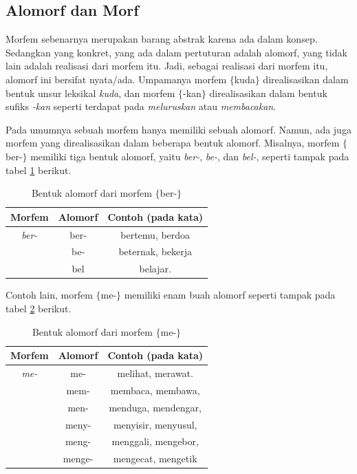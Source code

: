 \subsection{Alomorf dan Morf}
\label{sec:alomorfDanMorf}

Morfem sebenarnya merupakan barang abstrak karena ada dalam konsep. Sedangkan yang konkret, yang ada dalam pertuturan adalah alomorf, yang tidak lain adalah realisasi dari morfem itu\cite{chaer:08:morfologi}. Jadi, sebagai realisasi dari morfem itu, alomorf ini bersifat nyata/ada. Umpamanya morfem $\lbrace$kuda$\rbrace$ direalisasikan dalam bentuk unsur leksikal \textit{kuda}, dan morfem $\lbrace$-kan$\rbrace$ direalisasikan dalam bentuk sufiks \textit{-kan} seperti terdapat pada \textit{meluruskan} atau \textit{membacakan}.

Pada umumnya sebuah morfem hanya memiliki sebuah alomorf. Namun, ada juga morfem yang direalisasikan dalam beberapa bentuk alomorf. Misalnya, morfem $\lbrace$ber-$\rbrace$ memiliki tiga bentuk alomorf, yaitu \textit{ber-}, \textit{be-}, dan \textit{bel-}, seperti tampak pada tabel \ref{alomorfBer} berikut.

\begin{table}[H]
\centering
\begin{tabular}{|c|c|c|}
\hline
Morfem & Alomorf & Contoh (pada kata) \\
\hline
\textit{ber-} & ber- & bertemu, berdoa \\
&be-&beternak, bekerja \\
&bel&belajar. \\
\hline
\end{tabular}
\caption{Bentuk alomorf dari morfem $\lbrace$ber-$\rbrace$\cite{chaer:08:morfologi}}
\label{alomorfBer}
\end{table}

Contoh lain, morfem $\lbrace$me-$\rbrace$ memiliki enam buah alomorf seperti tampak pada tabel \ref{alomorfMe} berikut.

\begin{table}[H]
\centering
\begin{tabular}{|c|c|c|}
\hline
Morfem & Alomorf & Contoh (pada kata) \\
\hline
\textit{me-} & me- & melihat, merawat. \\
&mem-&membaca, membawa, \\
&men-&menduga, mendengar, \\
&meny-&menyisir, menyusul, \\
&meng-&menggali, mengebor, \\
&menge-&mengecat, mengetik \\
\hline
\end{tabular}
\caption{Bentuk alomorf dari morfem $\lbrace$me-$\rbrace$\cite{chaer:08:morfologi}}
\label{alomorfMe}
\end{table}

